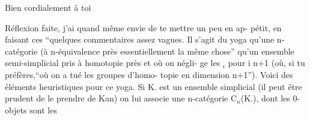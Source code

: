 Bien cordialement à toi


  Réflexion faite, j'ai quand même envie de te mettre un peu en ap-%
pétit, en faisant ces ``quelques commentaires assez vagues. Il s'agit du
yoga qu'une  n-catégorie  (à n-équivalence près\unsure{\hand{)}}   essentiellement la même
chose'' qu'un ensemble semi-simplicial pris à homotopie près et où on négli-%
ge les \hand{$\pi$}$_i$ pour i \hand{$\geq$} n+1 (où, si tu préfères,``où on a tué les groupes d'homo-%
topie en dimension \hand{$\geq$}n+1''). Voici des éléments heuristiques pour ce yoga.
Si K. est un ensemble simplicial (il peut être prudent de le prendre de
Kan) on lui associe une n-catégorie  C$_n$(K.), dont les 0-objets sont les

